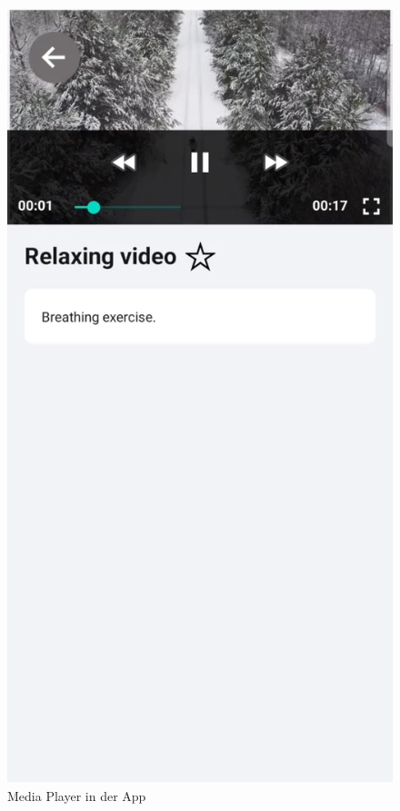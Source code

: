 \begin{figure}[H]
\begin{minipage}{0.5\textwidth}
    \end{minipage}
    \begin{minipage}{0.5\textwidth}
        \centering
        \includegraphics[height=2\textwidth]{./pics/MediaPlayer.jpg}
        \caption{Media Player in der App}
    \end{minipage}
\end{figure}

